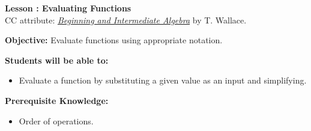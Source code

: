 \documentclass[12pt]{article}
\theoremstyle{definition}
\begin{document}
{\bf \large Lesson : Evaluating Functions}\label{les:evaluating_functions}
\\ CC attribute: \href{http://www.wallace.ccfaculty.org/book/book.html}{\it{Beginning and Intermediate Algebra}} by T. Wallace. 
\hfill \doclicenseImage[imagewidth=5em]\\
\par
{\bf Objective:} Evaluate functions using appropriate notation.\\
\par
{\bf Students will be able to:}
\begin{itemize}
	\item Evaluate a function by substituting a given value as an input and simplifying.
\end{itemize}
{\bf Prerequisite Knowledge:}
\begin{itemize}
	\item Order of operations.
\end{itemize}
\hrulefill
\end{document}
